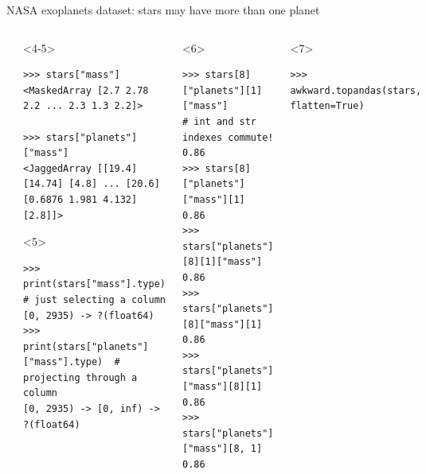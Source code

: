 \documentclass[aspectratio=169]{beamer}
\begin{document}
\begin{frame}[fragile]{NASA exoplanets dataset: stars may have more than one planet}
\begin{columns}
\begin{onlyenv}
\vspace{10 cm}
\end{onlyenv}
\begin{onlyenv}<4-5>
\begin{verbatim}
>>> stars["mass"]
<MaskedArray [2.7 2.78 2.2 ... 2.3 1.3 2.2]>

>>> stars["planets"]["mass"]
<JaggedArray [[19.4] [14.74] [4.8] ... [20.6] [0.6876 1.981 4.132] [2.8]]>
\end{verbatim}

\begin{uncoverenv}<5>
\begin{verbatim}
>>> print(stars["mass"].type)             # just selecting a column
[0, 2935) -> ?(float64)
>>> print(stars["planets"]["mass"].type)  # projecting through a column
[0, 2935) -> [0, inf) -> ?(float64)
\end{verbatim}
\end{uncoverenv}

\vspace{10 cm}
\end{onlyenv}
\begin{onlyenv}<6>
\begin{verbatim}
>>> stars[8]["planets"][1]["mass"]        # int and str indexes commute!
0.86
>>> stars[8]["planets"]["mass"][1]
0.86
>>> stars["planets"][8][1]["mass"]
0.86
>>> stars["planets"][8]["mass"][1]
0.86
>>> stars["planets"]["mass"][8][1]
0.86
>>> stars["planets"]["mass"][8, 1]
0.86
\end{verbatim}

\vspace{10 cm}
\end{onlyenv}
\begin{onlyenv}<7>
\vspace{-0.4 cm}
\begin{verbatim}
>>> awkward.topandas(stars, flatten=True)
\end{verbatim}


\end{onlyenv}
\end{columns}
\end{frame}
\end{document}
